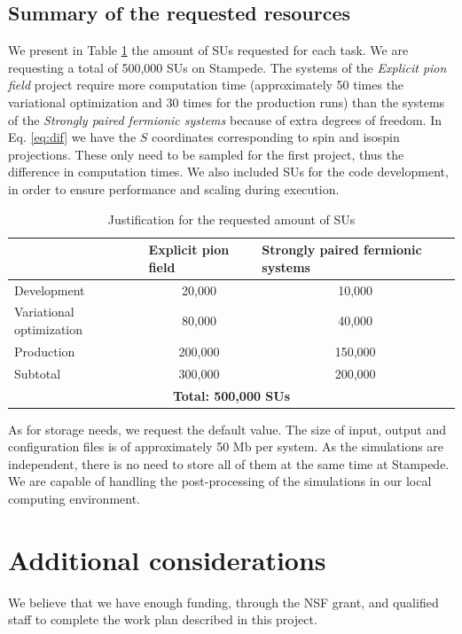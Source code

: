 \documentclass[12pt,letterpaper]{article}
\begin{document}
\subsection{Summary of the requested resources}

We present in Table \ref{tab:SUs} the amount of SUs requested for each task.
We are requesting a total of 500,000 SUs on Stampede.
The systems of the \textit{Explicit pion field} project require more 
computation time (approximately 50 times the variational optimization and 30 
times for the production runs) than the systems of the \textit{Strongly 
paired fermionic systems} because of extra degrees of freedom. In Eq. 
\ref{eq:dif} we have the $S$ coordinates corresponding to spin and isospin 
projections. These only need to be sampled for the first project, thus the 
difference in computation times. We also included SUs for the code 
development, in order to ensure performance and scaling during execution.

\begin{table}[htbp]
\center
\caption{Justification for the requested amount of SUs}
\begin{tabular}{|l|c|c|}
\hline
 & \multicolumn{1}{l|}{Explicit pion field} & \multicolumn{1}{l|}{Strongly 
 paired fermionic systems} \\ \hline\hline
Development & 20,000 & 10,000 \\ \hline
Variational optimization & 80,000 & 40,000 \\ \hline
Production & 200,000 & 150,000 \\ \hline
Subtotal & 300,000 & 200,000 \\ \hline\hline
\multicolumn{ 3}{|c|}{\textbf{Total: 500,000 SUs}} \\ \hline
\end{tabular}
\label{tab:SUs}
\end{table}

As for storage needs, we request the default value. The size of input, 
output and configuration files is of approximately 50 Mb per system. As the 
simulations are independent, there is no need to store all of them at the 
same time at Stampede. We are capable of handling the post-processing of the 
simulations in our local computing environment.

\section{Additional considerations}

We believe that we have enough funding, through the NSF grant, and qualified 
staff to complete the work plan described in this project.
\end{document}

